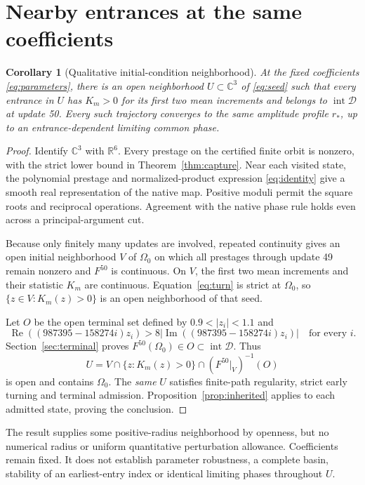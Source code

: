 \documentclass[11pt,a4paper]{article}
\numberwithin{equation}{section}
\newtheorem{corollary}[theorem]{Corollary}
\theoremstyle{remark}\newtheorem{remark}[theorem]{Remark}
\newcommand{\C}{\mathbb C}\newcommand{\R}{\mathbb R}
\newcommand{\re}{\operatorname{Re}}\newcommand{\im}{\operatorname{Im}}
\newcommand{\D}{\mathcal D}\newcommand{\Q}{\mathcal Q}
\begin{document}
\section{Nearby entrances at the same coefficients}\label{sec:neighborhood}
\begin{corollary}[Qualitative initial-condition neighborhood]\label{cor:neighborhood}
At the fixed coefficients \eqref{eq:parameters}, there is an open neighborhood $U\subset\C^3$ of \eqref{eq:seed} such that every entrance in $U$ has $K_m>0$ for its first two mean increments and belongs to $\operatorname{int}\D$ at update 50. Every such trajectory converges to the same amplitude profile $r_*$, up to an entrance-dependent limiting common phase.
\end{corollary}
\begin{proof}
Identify $\C^3$ with $\R^6$. Every prestage on the certified finite orbit is nonzero, with the strict lower bound in Theorem~\ref{thm:capture}. Near each visited state, the polynomial prestage and normalized-product expression \eqref{eq:identity} give a smooth real representation of the native map. Positive moduli permit the square roots and reciprocal operations. Agreement with the native phase rule holds even across a principal-argument cut.

Because only finitely many updates are involved, repeated continuity gives an open initial neighborhood $V$ of $\Omega_0$ on which all prestages through update 49 remain nonzero and $F^{50}$ is continuous. On $V$, the first two mean increments and their statistic $K_m$ are continuous. Equation~\eqref{eq:turn} is strict at $\Omega_0$, so $\{z\in V:K_m(z)>0\}$ is an open neighborhood of that seed.

Let $O$ be the open terminal set defined by $0.9<|z_i|<1.1$ and
\[
\re((987395-158274i)z_i)>8|\im((987395-158274i)z_i)|
\quad\text{for every }i.
\]
Section~\ref{sec:terminal} proves $F^{50}(\Omega_0)\in O\subset\operatorname{int}\D$. Thus
\begin{equation}
U=V\cap\{z:K_m(z)>0\}\cap(F^{50}|_V)^{-1}(O)\label{eq:neighborhood}
\end{equation}
is open and contains $\Omega_0$. The \emph{same} $U$ satisfies finite-path regularity, strict early turning and terminal admission. Proposition~\ref{prop:inherited} applies to each admitted state, proving the conclusion.
\end{proof}

The result supplies some positive-radius neighborhood by openness, but no numerical radius or uniform quantitative perturbation allowance. Coefficients remain fixed. It does not establish parameter robustness, a complete basin, stability of an earliest-entry index or identical limiting phases throughout $U$.
\end{document}
